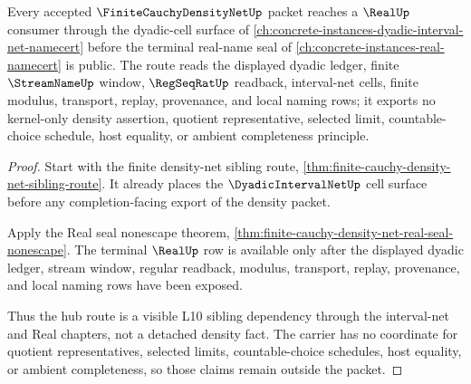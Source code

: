 \begin{theorem}
\label{thm:finite-cauchy-density-net-real-interval-route}
Every accepted $\FiniteCauchyDensityNetUp$ packet reaches a $\RealUp$ consumer through the dyadic-cell surface of \autoref{ch:concrete-instances-dyadic-interval-net-namecert} before the terminal real-name seal of \autoref{ch:concrete-instances-real-namecert} is public. The route reads the displayed dyadic ledger, finite $\StreamNameUp$ window, $\RegSeqRatUp$ readback, interval-net cells, finite modulus, transport, replay, provenance, and local naming rows; it exports no kernel-only density assertion, quotient representative, selected limit, countable-choice schedule, host equality, or ambient completeness principle.
\end{theorem}
\begin{proof}
Start with the finite density-net sibling route, \autoref{thm:finite-cauchy-density-net-sibling-route}. It already places the $\DyadicIntervalNetUp$ cell surface before any completion-facing export of the density packet.

Apply the Real seal nonescape theorem, \autoref{thm:finite-cauchy-density-net-real-seal-nonescape}. The terminal $\RealUp$ row is available only after the displayed dyadic ledger, stream window, regular readback, modulus, transport, replay, provenance, and local naming rows have been exposed.

Thus the hub route is a visible L10 sibling dependency through the interval-net and Real chapters, not a detached density fact. The carrier has no coordinate for quotient representatives, selected limits, countable-choice schedules, host equality, or ambient completeness, so those claims remain outside the packet.
\end{proof}
